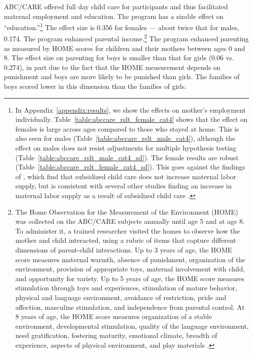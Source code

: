 ABC/CARE offered full day child care for participants and thus facilitated maternal employment and education. The program has a sizable effect on ``education.''\footnote{In Appendix~\ref{appendix:results}, we show the effects on mother's employment individually. Table~\ref{table:abccare_rslt_female_cat4} shows that the effect on females is large across ages compared to those who stayed at home. This is also seen for males (Table~\ref{table:abccare_rslt_male_cat4}), although the effect on males does not resist adjustments for multiple hypothesis testing (Table~\ref{table:abccare_rslt_male_cat4_sd}). The female results are robust (Table~\ref{table:abccare_rslt_female_cat4_sd}). This goes against the findings of \citet{Havnes_Mogstad_2011_JPE}, which find that subsidized child care does not increase maternal labor supply, but is consistent with several other studies finding an increase in maternal labor supply as a result of subsidized child care \citep{Bauernschuster_Schlotter_2015_JPE,Bettendorf_etal_2015_LE,Geyer_etal_2015_LE,Brilli_etal_2016_REH}.} The effect size is 0.356 for females --- about twice that for males, 0.174. The program enhanced parental income.\footnote{The Home Observation for the Measurement of the Environment (HOME) was collected on the ABC/CARE subjects annually until age 5 and at age 8. To administer it, a trained researcher visited the homes to observe how the mother and child interacted, using a rubric of items that capture different dimensions of parent-child interactions. Up to 3 years of age, the HOME score measures maternal warmth, absence of punishment, organization of the environment, provision of appropriate toys, maternal involvement with child, and opportunity for variety. Up to 5 years of age, the HOME score measures stimulation through toys and experiences, stimulation of mature behavior, physical and language environment, avoidance of restriction, pride and affection, masculine stimulation, and independence from parental control. At 8 years of age, the HOME score measures organization of a stable environment, developmental stimulation, quality of the language environment, need gratification, fostering maturity, emotional climate, breadth of experience, aspects of physical environment, and play materials \citep{Bradley-Caldwell_1977_AJMD}.} The program enhanced parenting as measured by HOME scores for children and their mothers between ages 0 and 8. The effect size on parenting for boys is smaller than that for girls (0.06 vs. 0.274), in part due to the fact that the HOME measurement depends on punishment and boys are more likely to be punished than girls. The families of boys scored lower in this dimension than the families of girls.

